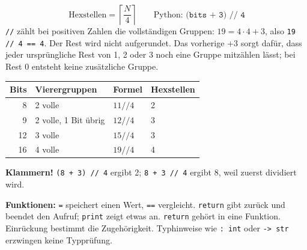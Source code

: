 \documentclass[10pt,a4paper]{article}
\newcommand{\block}[1]{\par\vspace{2mm}{\sffamily\large\bfseries #1}\par}
\newcommand{\code}[1]{\texttt{#1}}
\begin{document}
\block{Wie viele Hexstellen? Erst addieren, dann teilen}
\[
\text{Hexstellen}=\left\lceil\frac{N}{4}\right\rceil
\qquad\text{Python: }\code{(bits + 3) // 4}
\]
\code{//} zählt bei positiven Zahlen die vollständigen Gruppen:
$19=4\cdot4+3$, also \code{19 // 4 == 4}. Der Rest wird nicht aufgerundet.
Das vorherige $+3$ sorgt dafür, dass jeder ursprüngliche Rest von 1, 2 oder 3
noch eine Gruppe mitzählen lässt; bei Rest 0 entsteht keine zusätzliche Gruppe.
\begin{center}
\begin{tabular}{rlll}\toprule
Bits&Vierergruppen&Formel&Hexstellen\\\midrule
8&2 volle&$11\mathbin{//}4$&2\\
9&2 volle, 1 Bit übrig&$12\mathbin{//}4$&3\\
12&3 volle&$15\mathbin{//}4$&3\\
16&4 volle&$19\mathbin{//}4$&4\\\bottomrule
\end{tabular}
\end{center}
\textbf{Klammern!} \code{(8 + 3) // 4} ergibt 2;
\code{8 + 3 // 4} ergibt 8, weil zuerst dividiert wird.

\textbf{Funktionen:} \code{=} speichert einen Wert, \code{==} vergleicht.
\code{return} gibt zurück und beendet den Aufruf; \code{print} zeigt etwas an.
\code{return} gehört in eine Funktion. Einrückung bestimmt die Zugehörigkeit.
Typhinweise wie \code{: int} oder \code{-> str} erzwingen keine Typprüfung.
\end{document}
